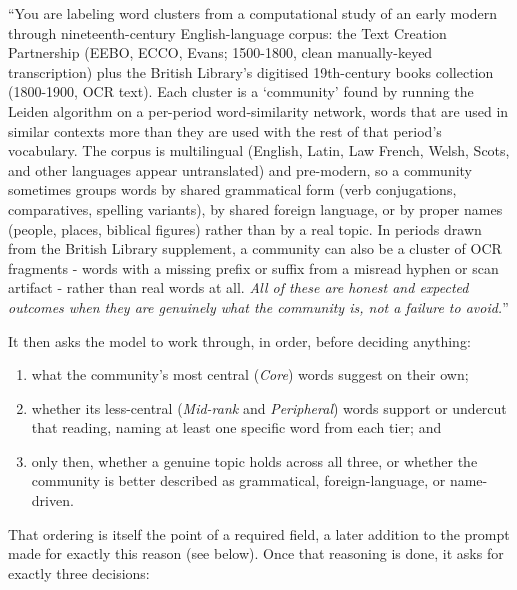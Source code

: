 \documentclass[11pt]{article}
\begin{document}
\begin{quotebox}
``You are labeling word clusters from a computational study of an early
modern through nineteenth-century English-language corpus: the Text
Creation Partnership (EEBO, ECCO, Evans; 1500-1800, clean manually-keyed
transcription) plus the British Library's digitised 19th-century books
collection (1800-1900, OCR text). Each cluster is a `community' found by
running the Leiden algorithm on a per-period word-similarity network,
words that are used in similar contexts more than they are used with the
rest of that period's vocabulary. The corpus is multilingual (English,
Latin, Law French, Welsh, Scots, and other languages appear untranslated)
and pre-modern, so a community sometimes groups words by shared
grammatical form (verb conjugations, comparatives, spelling variants), by
shared foreign language, or by proper names (people, places, biblical
figures) rather than by a real topic. In periods drawn from the British
Library supplement, a community can also be a cluster of OCR fragments -
words with a missing prefix or suffix from a misread hyphen or scan
artifact - rather than real words at all. \emph{All of these are honest
and expected outcomes when they are genuinely what the community is, not
a failure to avoid.}''

It then asks the model to work through, in order, before deciding
anything:

\begin{enumerate}[itemsep=0.3em]
  \item what the community's most central (\emph{Core}) words suggest
    on their own;
  \item whether its less-central (\emph{Mid-rank} and \emph{Peripheral})
    words support or undercut that reading, naming at least one
    specific word from each tier; and
  \item only then, whether a genuine topic holds across all three, or
    whether the community is better described as grammatical,
    foreign-language, or name-driven.
\end{enumerate}

That ordering is itself the point of a required  field,
a later addition to the prompt made for exactly this reason (see below).
Once that reasoning is done, it asks for exactly three decisions:


\end{quotebox}
\end{document}
